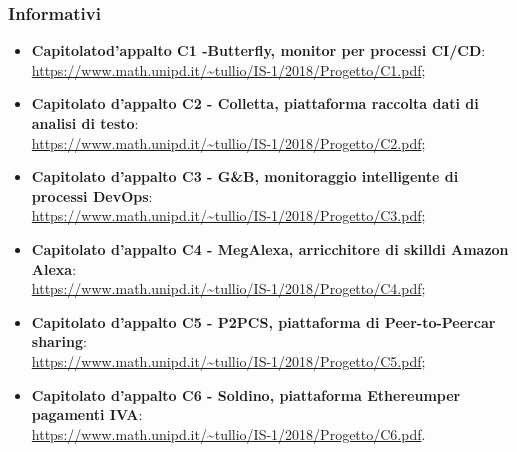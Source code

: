 \subsubsection{Informativi}
\begin{itemize}
	\item \textbf{Capitolato\glosp d'appalto C1 -Butterfly, monitor per processi CI/CD}: \\ \url{https://www.math.unipd.it/~tullio/IS-1/2018/Progetto/C1.pdf};
	
	\item \textbf{Capitolato d'appalto C2 - Colletta, piattaforma raccolta dati di analisi di testo}:\\
	\url{https://www.math.unipd.it/~tullio/IS-1/2018/Progetto/C2.pdf};
	
	\item \textbf{Capitolato d'appalto C3 - G\&B, monitoraggio intelligente di processi DevOps\glo}:\\
	\url{https://www.math.unipd.it/~tullio/IS-1/2018/Progetto/C3.pdf};
	
	\item \textbf{Capitolato d'appalto C4 - MegAlexa, arricchitore di skill\glosp di Amazon Alexa}:\\
	\url{https://www.math.unipd.it/~tullio/IS-1/2018/Progetto/C4.pdf};
	
	\item \textbf{Capitolato d'appalto C5 - P2PCS, piattaforma di Peer-to-Peer\glosp car sharing}:\\
	\url{https://www.math.unipd.it/~tullio/IS-1/2018/Progetto/C5.pdf};
	
	\item \textbf{Capitolato d'appalto C6 - Soldino, piattaforma Ethereum\glosp per pagamenti IVA}:\\
	\url{https://www.math.unipd.it/~tullio/IS-1/2018/Progetto/C6.pdf}.
\end{itemize}

	
	

